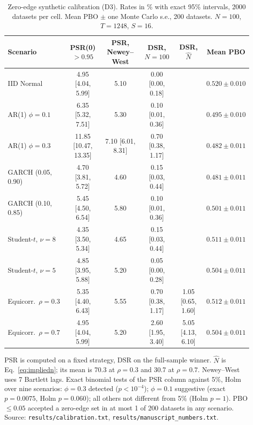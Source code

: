 \documentclass[11pt,a4paper]{article}
\theoremstyle{remark}
\begin{document}
\begin{table}[t]
\centering\small
\begin{threeparttable}
\footnotesize\setlength{\tabcolsep}{4pt}
\caption{Zero-edge synthetic calibration (D3). Rates in \% with exact 95\% intervals, 2000 datasets per cell. Mean PBO $\pm$ one Monte Carlo s.e., 200 datasets. $N=100$, $T=1248$, $S=16$.}\label{tab:calibration}
\begin{tabular}{@{}lccccc@{}}
\toprule
Scenario & PSR(0)$>0.95$ & PSR, Newey--West & DSR, $N=100$ & DSR, $\hat N$ & Mean PBO \\
\midrule
IID Normal & 4.95 [4.04, 5.99] & 5.10 & 0.00 [0.00, 0.18] & & $0.520\pm0.010$ \\
AR(1) $\phi=0.1$ & 6.35 [5.32, 7.51] & 5.30 & 0.10 [0.01, 0.36] & & $0.495\pm0.010$ \\
AR(1) $\phi=0.3$ & 11.85 [10.47, 13.35] & 7.10 [6.01, 8.31] & 0.70 [0.38, 1.17] & & $0.482\pm0.011$ \\
GARCH (0.05, 0.90) & 4.70 [3.81, 5.72] & 4.60 & 0.15 [0.03, 0.44] & & $0.481\pm0.011$ \\
GARCH (0.10, 0.85) & 5.45 [4.50, 6.54] & 5.80 & 0.10 [0.01, 0.36] & & $0.501\pm0.011$ \\
Student-$t$, $\nu=8$ & 4.35 [3.50, 5.34] & 4.65 & 0.15 [0.03, 0.44] & & $0.511\pm0.011$ \\
Student-$t$, $\nu=5$ & 4.85 [3.95, 5.88] & 5.20 & 0.05 [0.00, 0.28] & & $0.504\pm0.011$ \\
Equicorr.\ $\rho=0.3$ & 5.35 [4.40, 6.43] & 5.55 & 0.70 [0.38, 1.17] & 1.05 [0.65, 1.60] & $0.512\pm0.011$ \\
Equicorr.\ $\rho=0.7$ & 4.95 [4.04, 5.99] & 5.20 & 2.60 [1.95, 3.40] & 5.05 [4.13, 6.10] & $0.504\pm0.011$ \\
\bottomrule
\end{tabular}
\begin{tablenotes}\footnotesize
\item PSR is computed on a fixed strategy, DSR on the full-sample winner. $\hat N$ is Eq.~\eqref{eq:impliedn}; its mean is 70.3 at $\rho=0.3$ and 30.7 at $\rho=0.7$. Newey--West uses 7 Bartlett lags. Exact binomial tests of the PSR column against 5\%, Holm over nine scenarios: $\phi=0.3$ detected ($p<10^{-4}$); $\phi=0.1$ suggestive (exact $p=0.0075$, Holm $p=0.060$); all others not different from 5\% (Holm $p=1$). PBO$\le0.05$ accepted a zero-edge set in at most 1 of 200 datasets in any scenario. Source: \texttt{results/calibration.txt}, \texttt{results/manuscript\_numbers.txt}.
\end{tablenotes}
\end{threeparttable}
\end{table}
\end{document}
